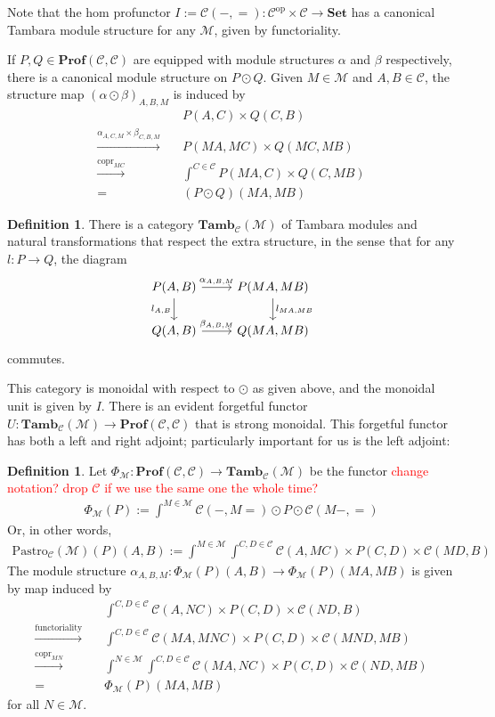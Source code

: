 \documentclass[11pt,a4paper]{article}
\theoremstyle{plain}
\theoremstyle{definition}
\newtheorem{definition}[theorem]{Definition}
\newcommand{\C}{\mathscr{C}}
\newcommand{\M}{\mathscr{M}}
\newcommand{\Pastro}{\Phi}
\newcommand{\Set}{\mathbf{Set}}
\newcommand{\Prof}{\mathbf{Prof}}
\newcommand{\Tamb}{\mathbf{Tamb}}
\newcommand{\op}{\mathrm{op}}
\DeclareMathOperator{\copr}{copr}
\newcommand{\todo}[1]{\textcolor{red}{\small #1}}
\begin{document}
Note that the hom profunctor $I := \C(-, =) : \C^\op \times \C \to \Set$ has a canonical Tambara module structure for any $\M$, given by functoriality.

If $P, Q \in \Prof(\C, \C)$ are equipped with module structures $\alpha$ and $\beta$ respectively, there is a canonical module structure on $P \odot Q$. Given $M \in \M$ and $A,B \in \C$, the structure map $(\alpha \odot \beta)_{A,B,M}$ is induced by
\begin{align*}
&P(A,C) \times Q(C,B)  \\
\xrightarrow{\alpha_{A,C,M} \times \beta_{C,B,M}} \quad& P(MA, MC) \times Q(MC, MB) \\
\xrightarrow{\copr_{MC}} \quad&\int^{C \in \C} P(MA, C) \times Q(C, MB) \\
= \quad&(P \odot Q)(MA, MB)
\end{align*}

\begin{definition}
There is a category $\Tamb_\C(\M)$ of Tambara modules and natural transformations that respect the extra structure, in the sense that for any $l : P \to Q$, the diagram
\[
\begin{tikzcd}
P(A,B) \ar[r, "\alpha_{A,B,M}"] \ar[d, "l_{A,B}" left] & P(MA, MB) \ar[d, "l_{MA, MB}" right] \\
Q(A,B) \ar[r, "\beta_{A,B,M}"] & Q(MA, MB)
\end{tikzcd}
\]
commutes.
\end{definition}

This category is monoidal with respect to $\odot$ as given above, and the monoidal unit is given by $I$. There is an evident forgetful functor $U : \Tamb_\C(\M) \to \Prof(\C, \C)$ that is strong monoidal. This forgetful functor has both a left and right adjoint; particularly important for us is the left adjoint:

\begin{definition}
Let $\Pastro_\M : \Prof(\C, \C) \to \Tamb_\C(\M)$ be the functor \todo{change notation? drop $\C$ if we use the same one the whole time?}
\begin{align*}
\Pastro_\M(P) := \int^{M \in \M}  \C(-, M{=}) \odot P \odot \C(M-, {=}) 
\end{align*}
Or, in other words, 
\begin{align*}
\mathrm{Pastro}_\C(\M)(P)(A,B) := \int^{M \in \M} \int^{C,D \in \C} \C(A, MC) \times P(C,D) \times  \C(MD, B)
\end{align*}
The module structure $\alpha_{A,B,M} : \Pastro_\M(P)(A,B) \to \Pastro_\M(P)(MA, MB)
$ is given by map induced by 
\begin{align*}
&\int^{C,D \in \C} \C(A, NC) \times P(C,D) \times  \C(ND, B) \\
\xrightarrow{\text{functoriality}} \quad& \int^{C,D \in \C} \C(MA, MNC) \times P(C,D) \times  \C(MND, MB) \\
\xrightarrow{\copr_{MN}} \quad&\int^{N \in \M} \int^{C,D \in \C} \C(MA, NC) \times P(C,D) \times  \C(ND, MB) \\
= \quad&\Pastro_\M(P)(MA, MB)
\end{align*}
for all $N \in \M$.
\end{definition}
\end{document}
